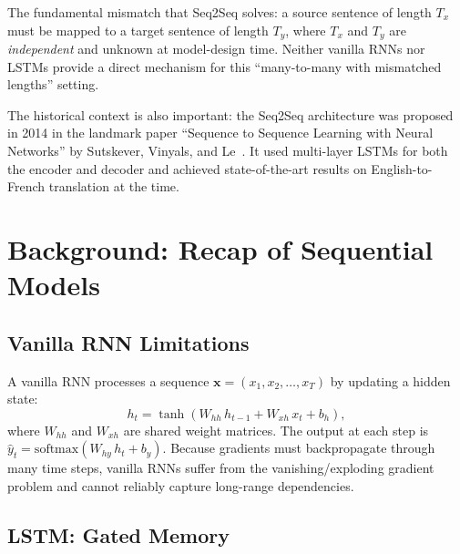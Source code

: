 \documentclass[12pt,a4paper]{article}
\begin{document}
\begin{keyinsight}
  The fundamental mismatch that Seq2Seq solves: a source sentence of length $T_x$ must be
  mapped to a target sentence of length $T_y$, where $T_x$ and $T_y$ are \emph{independent}
  and unknown at model-design time. Neither vanilla RNNs nor LSTMs provide a direct mechanism
  for this ``many-to-many with mismatched lengths'' setting.
\end{keyinsight}

The historical context is also important: the Seq2Seq architecture was proposed in 2014 in the
landmark paper ``Sequence to Sequence Learning with Neural Networks'' by Sutskever, Vinyals, and
Le~\cite{sutskever2014}. It used multi-layer LSTMs for both the encoder and decoder and achieved
state-of-the-art results on English-to-French translation at the time.

\section{Background: Recap of Sequential Models}
\label{sec:background}

\subsection{Vanilla RNN Limitations}

A vanilla RNN processes a sequence $\mathbf{x} = (x_1, x_2, \ldots, x_T)$ by updating a hidden
state:
\begin{equation}
  h_t = \tanh\!\left(W_{hh}\,h_{t-1} + W_{xh}\,x_t + b_h\right),
  \label{eq:rnn_hidden}
\end{equation}
where $W_{hh}$ and $W_{xh}$ are shared weight matrices. The output at each step is
$\hat{y}_t = \text{softmax}(W_{hy}\,h_t + b_y)$. Because gradients must backpropagate through
many time steps, vanilla RNNs suffer from the vanishing/exploding gradient problem and cannot
reliably capture long-range dependencies.

\subsection{LSTM: Gated Memory}
\end{document}
